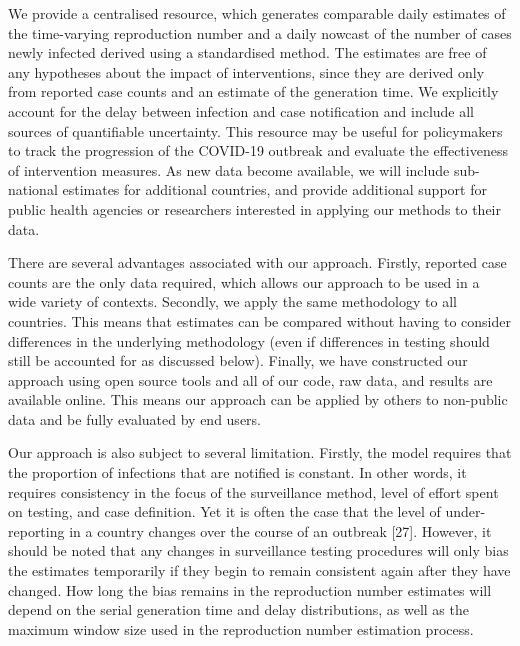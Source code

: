 \documentclass[]{article}
\begin{document}
We provide a centralised resource, which generates comparable daily
estimates of the time-varying reproduction number and a daily nowcast of
the number of cases newly infected derived using a standardised method.
The estimates are free of any hypotheses about the impact of
interventions, since they are derived only from reported case counts and
an estimate of the generation time. We explicitly account for the delay
between infection and case notification and include all sources of
quantifiable uncertainty. This resource may be useful for policymakers
to track the progression of the COVID-19 outbreak and evaluate the
effectiveness of intervention measures. As new data become available, we
will include sub-national estimates for additional countries, and
provide additional support for public health agencies or researchers
interested in applying our methods to their data.

There are several advantages associated with our approach. Firstly,
reported case counts are the only data required, which allows our
approach to be used in a wide variety of contexts. Secondly, we apply
the same methodology to all countries. This means that estimates can be
compared without having to consider differences in the underlying
methodology (even if differences in testing should still be accounted
for as discussed below). Finally, we have constructed our approach using
open source tools and all of our code, raw data, and results are
available online. This means our approach can be applied by others to
non-public data and be fully evaluated by end users.

Our approach is also subject to several limitation. Firstly, the model
requires that the proportion of infections that are notified is
constant. In other words, it requires consistency in the focus of the
surveillance method, level of effort spent on testing, and case
definition. Yet it is often the case that the level of under-reporting
in a country changes over the course of an outbreak {[}27{]}. However,
it should be noted that any changes in surveillance testing procedures
will only bias the estimates temporarily if they begin to remain
consistent again after they have changed. How long the bias remains in
the reproduction number estimates will depend on the serial generation
time and delay distributions, as well as the maximum window size used in
the reproduction number estimation process.
\end{document}
